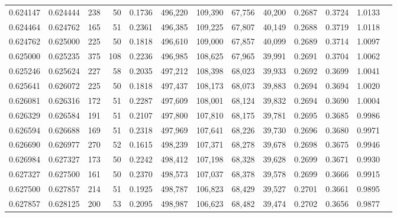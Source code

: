\begin{tabular}{rrrrrrrrrrrrr}
0.624147 & 0.624444 &    238 &    50 &                                     0.1736 & 496,220 & 109,390 &  67,756 &  40,200 & 0.2687 & 0.3724 & 1.0133 \\
0.624464 & 0.624762 &    165 &    51 &                                     0.2361 & 496,385 & 109,225 &  67,807 &  40,149 & 0.2688 & 0.3719 & 1.0118 \\
0.624762 & 0.625000 &    225 &    50 &                                     0.1818 & 496,610 & 109,000 &  67,857 &  40,099 & 0.2689 & 0.3714 & 1.0097 \\
0.625000 & 0.625235 &    375 &   108 &                                     0.2236 & 496,985 & 108,625 &  67,965 &  39,991 & 0.2691 & 0.3704 & 1.0062 \\
0.625246 & 0.625624 &    227 &    58 &                                     0.2035 & 497,212 & 108,398 &  68,023 &  39,933 & 0.2692 & 0.3699 & 1.0041 \\
0.625641 & 0.626072 &    225 &    50 &                                     0.1818 & 497,437 & 108,173 &  68,073 &  39,883 & 0.2694 & 0.3694 & 1.0020 \\
0.626081 & 0.626316 &    172 &    51 &                                     0.2287 & 497,609 & 108,001 &  68,124 &  39,832 & 0.2694 & 0.3690 & 1.0004 \\
0.626329 & 0.626584 &    191 &    51 &                                     0.2107 & 497,800 & 107,810 &  68,175 &  39,781 & 0.2695 & 0.3685 & 0.9986 \\
0.626594 & 0.626688 &    169 &    51 &                                     0.2318 & 497,969 & 107,641 &  68,226 &  39,730 & 0.2696 & 0.3680 & 0.9971 \\
0.626690 & 0.626977 &    270 &    52 &                                     0.1615 & 498,239 & 107,371 &  68,278 &  39,678 & 0.2698 & 0.3675 & 0.9946 \\
0.626984 & 0.627327 &    173 &    50 &                                     0.2242 & 498,412 & 107,198 &  68,328 &  39,628 & 0.2699 & 0.3671 & 0.9930 \\
0.627327 & 0.627500 &    161 &    50 &                                     0.2370 & 498,573 & 107,037 &  68,378 &  39,578 & 0.2699 & 0.3666 & 0.9915 \\
0.627500 & 0.627857 &    214 &    51 &                                     0.1925 & 498,787 & 106,823 &  68,429 &  39,527 & 0.2701 & 0.3661 & 0.9895 \\
0.627857 & 0.628125 &    200 &    53 &                                     0.2095 & 498,987 & 106,623 &  68,482 &  39,474 & 0.2702 & 0.3656 & 0.9877 \\

\end{tabular}
